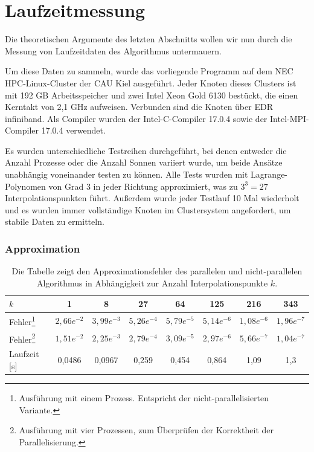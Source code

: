   \section{Laufzeitmessung}
  \label{sec:lauf}
  Die theoretischen Argumente des letzten Abschnitts wollen wir nun durch die Messung von Laufzeitdaten des Algorithmus untermauern.
  
  Um diese Daten zu sammeln, wurde das vorliegende Programm auf dem NEC HPC-Linux-Cluster der CAU Kiel ausgeführt. Jeder Knoten dieses Clusters ist mit 192 GB Arbeitsspeicher und zwei Intel Xeon Gold 
  6130 bestückt, die einen Kerntakt von 2,1 GHz aufweisen. Verbunden sind die Knoten über EDR infiniband. Als Compiler wurden der Intel-C-Compiler 17.0.4 sowie der Intel-MPI-Compiler 17.0.4 verwendet.
  
  Es wurden unterschiedliche Testreihen durchgeführt, bei denen entweder die Anzahl Prozesse oder die Anzahl Sonnen variiert wurde, um beide Ansätze unabhängig voneinander testen zu können.
  Alle Tests wurden mit Lagrange-Polynomen von Grad $3$ in jeder Richtung approximiert, was zu $3^3 = 27$ Interpolationspunkten führt. Außerdem wurde jeder Testlauf 10 Mal wiederholt und es wurden immer 
  vollständige Knoten im Clustersystem angefordert, um stabile Daten zu ermitteln.
  
  \subsubsection{Approximation}
  
  
  \begin{table}[b]
    \begin{tabular}{|l|c c c c c c c|}
    \hline
    $k$ & 1 & 8 & 27 & 64 & 125 & 216 & 343\\
    \hline
    Fehler\footnote{Ausführung mit einem Prozess. Entspricht der nicht-parallelisierten Variante.} 
    & $2,66e^{-2}$ & $3,99e^{-3}$ & $5,26e^{-4}$ & $5,79e^{-5}$ & $5,14e^{-6}$ & $1,08e^{-6}$ & $1,96e^{-7}$\\
    \hline
    Fehler\footnote{Ausführung mit vier Prozessen, zum Überprüfen der Korrektheit der Parallelisierung.} 
    & $1,51e^{-2}$ & $2,25e^{-3}$ & $2,79e^{-4}$ & $3,09e^{-5}$ & $2,97e^{-6}$ & $5,66e^{-7}$ & $1,04e^{-7}$\\
    \hline
    Laufzeit [s] & 0,0486 & 0,0967 & 0,259 & 0,454 & 0,864 & 1,09 & 1,3\\
    \hline
    \end{tabular}
    \caption{Die Tabelle zeigt den Approximationsfehler des parallelen und nicht-parallelen Algorithmus in Abhängigkeit zur Anzahl Interpolationspunkte $k$.}
    \label{tab:error}
  \end{table}
  
